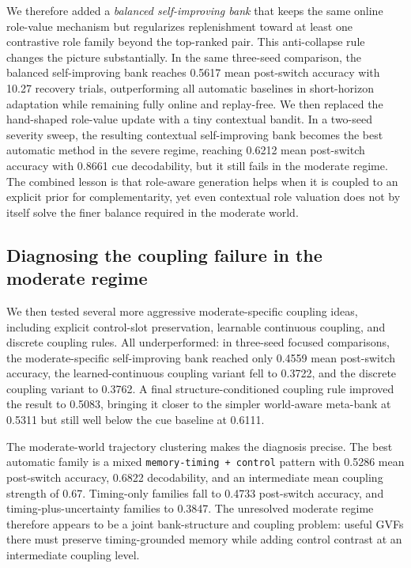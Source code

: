 \documentclass[11pt]{article}
\begin{document}
We therefore added a \emph{balanced self-improving bank} that keeps the same online role-value mechanism but regularizes replenishment toward at least one contrastive role family beyond the top-ranked pair. This anti-collapse rule changes the picture substantially. In the same three-seed comparison, the balanced self-improving bank reaches 0.5617 mean post-switch accuracy with 10.27 recovery trials, outperforming all automatic baselines in short-horizon adaptation while remaining fully online and replay-free. We then replaced the hand-shaped role-value update with a tiny contextual bandit. In a two-seed severity sweep, the resulting contextual self-improving bank becomes the best automatic method in the severe regime, reaching 0.6212 mean post-switch accuracy with 0.8661 cue decodability, but it still fails in the moderate regime. The combined lesson is that role-aware generation helps when it is coupled to an explicit prior for complementarity, yet even contextual role valuation does not by itself solve the finer balance required in the moderate world.

\subsection{Diagnosing the coupling failure in the moderate regime}
We then tested several more aggressive moderate-specific coupling ideas, including explicit control-slot preservation, learnable continuous coupling, and discrete coupling rules. All underperformed: in three-seed focused comparisons, the moderate-specific self-improving bank reached only 0.4559 mean post-switch accuracy, the learned-continuous coupling variant fell to 0.3722, and the discrete coupling variant to 0.3762. A final structure-conditioned coupling rule improved the result to 0.5083, bringing it closer to the simpler world-aware meta-bank at 0.5311 but still well below the cue baseline at 0.6111.

The moderate-world trajectory clustering makes the diagnosis precise. The best automatic family is a mixed \texttt{memory-timing + control} pattern with 0.5286 mean post-switch accuracy, 0.6822 decodability, and an intermediate mean coupling strength of 0.67. Timing-only families fall to 0.4733 post-switch accuracy, and timing-plus-uncertainty families to 0.3847. The unresolved moderate regime therefore appears to be a joint bank-structure and coupling problem: useful GVFs there must preserve timing-grounded memory while adding control contrast at an intermediate coupling level.
\end{document}
